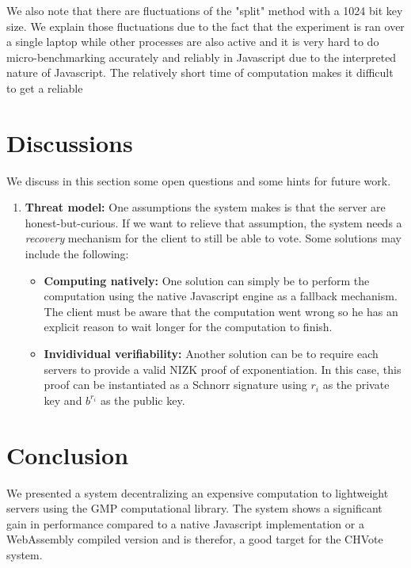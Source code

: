 \documentclass[]{article}
\begin{document}
We also note that there are fluctuations of the "split" method with a 1024 bit
key size.  We explain those fluctuations due to the fact that the experiment is
ran over a single laptop while other processes are also active and it is very
hard to do micro-benchmarking accurately and reliably in Javascript due to the
interpreted nature of Javascript.  The relatively short time of computation
makes it difficult to get a reliable

\section{Discussions} \label{discussions}

We discuss in this section some open questions and some hints for future work. 

\begin{enumerate} 

    \item \textbf{Threat model:} One assumptions the system makes is that the
        server are honest-but-curious. If we want to relieve that assumption,
        the system needs a \textit{recovery} mechanism for the client to still
        be able to vote.  Some solutions may include the following: 

        \begin{itemize} 

            \item \textbf{Computing natively:} One solution can simply be to
                perform the computation using the native Javascript engine as a
                fallback mechanism. The client must be aware that the
                computation went wrong so he has an explicit reason to wait
                longer for the computation to finish.  

            \item \textbf{Invidividual verifiability:} Another solution can be
                to require each servers to provide a valid NIZK proof of
                exponentiation. In this case, this proof can be instantiated as
                a Schnorr signature using $r_i$ as the private key and $b^{r_i}$
                as the public key.  

        \end{itemize} 

\end{enumerate}

\section{Conclusion}

We presented a system decentralizing an expensive computation to lightweight
servers using the GMP computational library. The system shows a significant gain
in performance compared to a native Javascript implementation or a WebAssembly
compiled version and is therefor, a good target for the CHVote system.




\end{document}
